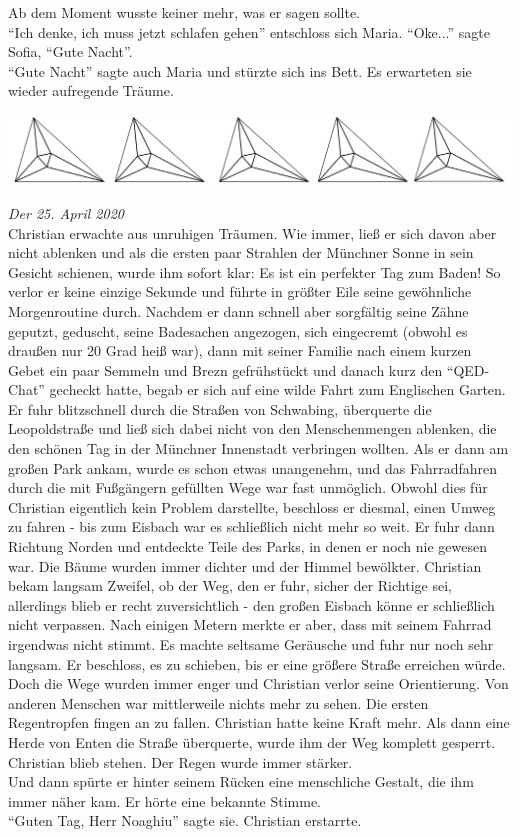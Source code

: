 \documentclass[oneside]{memoir}
\newcommand{\parasep}{
\bigskip
\bigskip
\begin{center} 
   \includegraphics[scale=.08]{parasep5.jpg} 
\end{center}
\bigskip
\bigskip
}
\begin{document}
Ab dem Moment wusste keiner mehr, was er sagen sollte.  \\ 
“Ich denke, ich muss jetzt schlafen gehen” entschloss sich Maria.
“Oke...” sagte Sofia, “Gute Nacht”. \\ 
“Gute Nacht” sagte auch Maria und stürzte sich ins Bett. 
Es erwarteten sie wieder aufregende Träume.
     
     \parasep
     \textit{Der 25. April 2020} \\
     
     Christian erwachte aus unruhigen Träumen. Wie immer, ließ er sich davon aber nicht ablenken und als die ersten paar Strahlen der Münchner Sonne in sein Gesicht schienen, wurde ihm sofort klar: Es ist ein perfekter Tag zum Baden!
So verlor er keine einzige Sekunde und führte in größter Eile seine gewöhnliche Morgenroutine durch.
Nachdem er dann schnell aber sorgfältig seine Zähne geputzt, geduscht, seine Badesachen angezogen, sich eingecremt (obwohl es draußen nur 20 Grad heiß war), dann mit seiner Familie nach einem kurzen Gebet ein paar Semmeln und Brezn gefrühstückt und danach kurz den “QED-Chat” gecheckt hatte, begab er sich auf eine wilde Fahrt zum Englischen Garten.
Er fuhr blitzschnell durch die Straßen von Schwabing, überquerte die Leopoldstraße und ließ sich dabei nicht von den Menschenmengen ablenken, die den schönen Tag in der Münchner Innenstadt verbringen wollten. Als er dann am großen Park ankam, wurde es schon etwas unangenehm, und das Fahrradfahren durch die mit Fußgängern gefüllten Wege war fast unmöglich. Obwohl dies für Christian eigentlich kein Problem darstellte, beschloss er diesmal, einen Umweg zu fahren - bis zum Eisbach war es schließlich nicht mehr so weit.
Er fuhr dann Richtung Norden und entdeckte Teile des Parks, in denen er noch nie gewesen war. Die Bäume wurden immer dichter und der Himmel bewölkter. Christian bekam langsam Zweifel, ob der Weg, den er fuhr, sicher der Richtige sei, allerdings blieb er recht zuversichtlich - den großen Eisbach könne er schließlich nicht verpassen.
Nach einigen Metern merkte er aber, dass mit seinem Fahrrad irgendwas nicht stimmt. Es machte seltsame Geräusche und fuhr nur noch sehr langsam. Er beschloss, es zu schieben, bis er eine größere Straße erreichen würde. Doch die Wege wurden immer enger und Christian verlor seine Orientierung. Von anderen Menschen war mittlerweile nichts mehr zu sehen. Die ersten Regentropfen fingen an zu fallen.
Christian hatte keine Kraft mehr. Als dann eine Herde von Enten die Straße überquerte, wurde ihm der Weg komplett gesperrt.  \\
Christian blieb stehen.
Der Regen wurde immer stärker. \\
Und dann spürte er hinter seinem Rücken eine menschliche Gestalt, die ihm immer näher kam.
Er hörte eine bekannte Stimme. \\
“Guten Tag, Herr Noaghiu” sagte sie.
Christian erstarrte.
 
\end{document}

